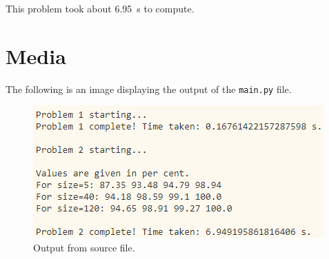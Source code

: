 \documentclass{article}
\renewcommand{\c}[1]{\texttt{#1}}
\begin{document}
This problem took about \SI{6.95}{s} to compute.

\section{Media} The following is an image displaying
the output of the \c{main.py} file.

\begin{figure}[H]
    \centering
    \includegraphics[width=\textwidth]{Images/output}
    \caption{Output from source file.}
    \label{figure:output}
\end{figure}
\end{document}
